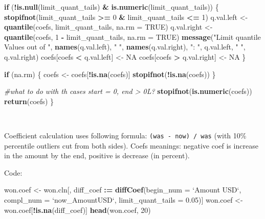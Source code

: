 \documentclass[]{article}
\newenvironment{Shaded}{\begin{snugshade}}{\end{snugshade}}
\newcommand{\CommentTok}[1]{\textcolor[rgb]{0.56,0.35,0.01}{\textit{#1}}}
\newcommand{\ControlFlowTok}[1]{\textcolor[rgb]{0.13,0.29,0.53}{\textbf{#1}}}
\newcommand{\DataTypeTok}[1]{\textcolor[rgb]{0.13,0.29,0.53}{#1}}
\newcommand{\DecValTok}[1]{\textcolor[rgb]{0.00,0.00,0.81}{#1}}
\newcommand{\ErrorTok}[1]{\textcolor[rgb]{0.64,0.00,0.00}{\textbf{#1}}}
\newcommand{\FloatTok}[1]{\textcolor[rgb]{0.00,0.00,0.81}{#1}}
\newcommand{\KeywordTok}[1]{\textcolor[rgb]{0.13,0.29,0.53}{\textbf{#1}}}
\newcommand{\NormalTok}[1]{#1}
\newcommand{\OperatorTok}[1]{\textcolor[rgb]{0.81,0.36,0.00}{\textbf{#1}}}
\newcommand{\OtherTok}[1]{\textcolor[rgb]{0.56,0.35,0.01}{#1}}
\newcommand{\StringTok}[1]{\textcolor[rgb]{0.31,0.60,0.02}{#1}}
\begin{document}
\begin{Shaded}
\begin{Highlighting}[]
    \ControlFlowTok{if}\NormalTok{ (}\OperatorTok{!}\KeywordTok{is.null}\NormalTok{(limit_quant_tails) }\OperatorTok{&}\StringTok{ }\KeywordTok{is.numeric}\NormalTok{(limit_quant_tails)) \{}
        \KeywordTok{stopifnot}\NormalTok{(limit_quant_tails }\OperatorTok{>=}\StringTok{ }\DecValTok{0} \OperatorTok{&}\StringTok{ }\NormalTok{limit_quant_tails }\OperatorTok{<=}\StringTok{ }\DecValTok{1}\NormalTok{)}
\NormalTok{        q.val.left <-}\StringTok{ }\KeywordTok{quantile}\NormalTok{(coefs, limit_quant_tails, }\DataTypeTok{na.rm =} \OtherTok{TRUE}\NormalTok{)}
\NormalTok{        q.val.right <-}\StringTok{ }\KeywordTok{quantile}\NormalTok{(coefs, }\DecValTok{1} \OperatorTok{-}\StringTok{ }\NormalTok{limit_quant_tails, }\DataTypeTok{na.rm =} \OtherTok{TRUE}\NormalTok{)}
        \KeywordTok{message}\NormalTok{(}\StringTok{"Limit quantile Values out of "}\NormalTok{, }\KeywordTok{names}\NormalTok{(q.val.left), }\StringTok{" "}\NormalTok{,}
                \KeywordTok{names}\NormalTok{(q.val.right), }\StringTok{": "}\NormalTok{, q.val.left, }\StringTok{" "}\NormalTok{,  q.val.right)}
\NormalTok{        coefs[coefs }\OperatorTok{<}\StringTok{ }\NormalTok{q.val.left] <-}\StringTok{ }\OtherTok{NA}
\NormalTok{        coefs[coefs }\OperatorTok{>}\StringTok{ }\NormalTok{q.val.right] <-}\StringTok{ }\OtherTok{NA}
\NormalTok{    \}}
    
    \ControlFlowTok{if}\NormalTok{ (na.rm) \{}
\NormalTok{        coefs <-}\StringTok{ }\NormalTok{coefs[}\OperatorTok{!}\KeywordTok{is.na}\NormalTok{(coefs)]}
        \KeywordTok{stopifnot}\NormalTok{(}\OperatorTok{!}\KeywordTok{is.na}\NormalTok{(coefs))}
\NormalTok{    \}}
    
    \CommentTok{#what to do with th cases start = 0, end > 0L?}
    \KeywordTok{stopifnot}\NormalTok{(}\KeywordTok{is.numeric}\NormalTok{(coefs))}
    \KeywordTok{return}\NormalTok{(coefs)}
\NormalTok{\}}
\end{Highlighting}
\end{Shaded}

~

Coefficient calculation uses following formula:
\texttt{(was\ -\ now)\ /\ was} (with 10\% percentile outliers cut from
both sides). Coefs meanings: negative coef is increase in the amount by
the end, positive is decrease (in percent).

Code:

\begin{Shaded}
\begin{Highlighting}[]
\NormalTok{won.coef <-}\StringTok{ }\NormalTok{won.cln[, diff_coef }\OperatorTok{:}\ErrorTok{=}\StringTok{ }\KeywordTok{diffCoef}\NormalTok{(}\DataTypeTok{begin_num =} \StringTok{`}\DataTypeTok{Amount USD}\StringTok{`}\NormalTok{,}
                                            \DataTypeTok{compl_num =} \StringTok{`}\DataTypeTok{now_AmountUSD}\StringTok{`}\NormalTok{,}
                                            \DataTypeTok{limit_quant_tails =} \FloatTok{0.05}\NormalTok{)]}
\NormalTok{won.coef <-}\StringTok{ }\NormalTok{won.coef[}\OperatorTok{!}\KeywordTok{is.na}\NormalTok{(diff_coef)]}
\KeywordTok{head}\NormalTok{(won.coef, }\DecValTok{20}\NormalTok{)}
\end{Highlighting}
\end{Shaded}
\end{document}
